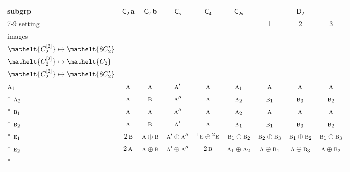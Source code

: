 \documentclass[10pt,a4paper]{article}
\numberwithin{equation}{section}
\newcommand{\eltfont}[1]{{\let\sigma\eltsigma\mathelt{#1}}}
\newcommand{\grp}[1]{\mathsf{#1}}
\newcommand{\irr}[1]{\text{\normalfont\scshape #1}}
\newcommand{\conjpair}[1]{{}^{#1}}
\newcommand{\cls}[1]{\eltfont{#1}}
\newcommand{\clsletter}[1]{\,{\scriptsize\color{black!55}#1}}
\newcommand{\genidx}[2]{#1^{[\mathrm{#2}]}}
\begin{document}
{\small\begin{longtable}{@{}lcccccccc@{}}\toprule
subgrp & \href{C2.pdf}{$\grp{C_{2}}$}\clsletter{a} & \href{C2.pdf}{$\grp{C_{2}}$}\clsletter{b} & \href{C1v.pdf}{$\grp{C_{s}}$} & \href{C4.pdf}{$\grp{C_{4}}$} & \href{C2v.pdf}{$\grp{C_{2v}}$} & \multicolumn{3}{c}{\href{D2.pdf}{$\grp{D_{2}}$}}\\\cmidrule(lr){7-9}
setting &  &  &  &  &  & 1 & 2 & 3\\
images &  &  &  &  &  & {\scriptsize\begin{tabular}[t]{@{}c@{}}$\cls{\genidx{C_{2}}{1}} \mapsto \cls{C_{2}}$\\$\cls{\genidx{C_{2}}{2}} \mapsto \cls{8C_{2}'}$\end{tabular}} & {\scriptsize\begin{tabular}[t]{@{}c@{}}$\cls{\genidx{C_{2}}{1}} \mapsto \cls{8C_{2}'}$\\$\cls{\genidx{C_{2}}{2}} \mapsto \cls{C_{2}}$\end{tabular}} & {\scriptsize\begin{tabular}[t]{@{}c@{}}$\cls{\genidx{C_{2}}{1}} \mapsto \cls{8C_{2}'}$\\$\cls{\genidx{C_{2}}{2}} \mapsto \cls{8C_{2}'}$\end{tabular}}\\\midrule\endhead
\bottomrule\endfoot\endlastfoot
$\irr{a}_{1}$ & $\irr{a}$ & $\irr{a}$ & $\irr{a}'$ & $\irr{a}$ & $\irr{a}_{1}$ & $\irr{a}$ & $\irr{a}$ & $\irr{a}$\\*
$\irr{a}_{2}$ & $\irr{a}$ & $\irr{b}$ & $\irr{a}''$ & $\irr{a}$ & $\irr{a}_{2}$ & $\irr{b}_{1}$ & $\irr{b}_{3}$ & $\irr{b}_{2}$\\*
$\irr{b}_{1}$ & $\irr{a}$ & $\irr{a}$ & $\irr{a}''$ & $\irr{a}$ & $\irr{a}_{2}$ & $\irr{a}$ & $\irr{a}$ & $\irr{a}$\\*
$\irr{b}_{2}$ & $\irr{a}$ & $\irr{b}$ & $\irr{a}'$ & $\irr{a}$ & $\irr{a}_{1}$ & $\irr{b}_{1}$ & $\irr{b}_{3}$ & $\irr{b}_{2}$\\*
$\irr{e}_{1}$ & $2\,\irr{b}$ & $\irr{a}\oplus \irr{b}$ & $\irr{a}'\oplus \irr{a}''$ & $\conjpair{1}\irr{e}\oplus \conjpair{2}\irr{e}$ & $\irr{b}_{1}\oplus \irr{b}_{2}$ & $\irr{b}_{2}\oplus \irr{b}_{3}$ & $\irr{b}_{1}\oplus \irr{b}_{2}$ & $\irr{b}_{1}\oplus \irr{b}_{3}$\\*
$\irr{e}_{2}$ & $2\,\irr{a}$ & $\irr{a}\oplus \irr{b}$ & $\irr{a}'\oplus \irr{a}''$ & $2\,\irr{b}$ & $\irr{a}_{1}\oplus \irr{a}_{2}$ & $\irr{a}\oplus \irr{b}_{1}$ & $\irr{a}\oplus \irr{b}_{3}$ & $\irr{a}\oplus \irr{b}_{2}$\\*

\end{longtable}}
\end{document}

